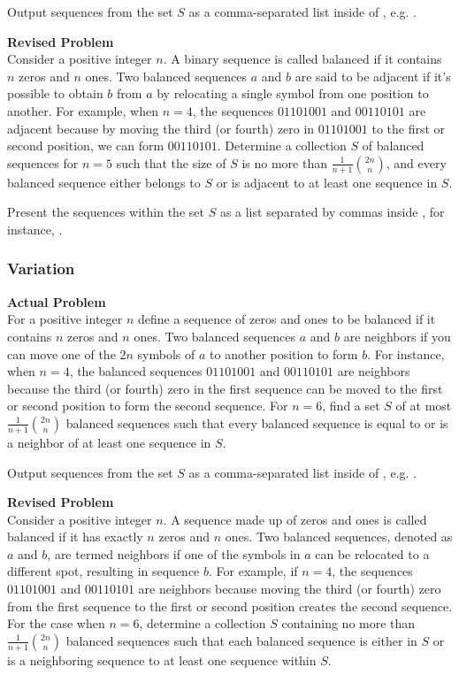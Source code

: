 Output sequences from the set $S$ as a comma-separated list inside of \boxed{}, e.g. .

\textbf{Revised Problem}\\
Consider a positive integer $n$. A binary sequence is called balanced if it contains $n$ zeros and $n$ ones. Two balanced sequences $a$ and $b$ are said to be adjacent if it's possible to obtain $b$ from $a$ by relocating a single symbol from one position to another. For example, when $n = 4$, the sequences $01101001$ and $00110101$ are adjacent because by moving the third (or fourth) zero in $01101001$ to the first or second position, we can form $00110101$. Determine a collection $S$ of balanced sequences for $n = 5$ such that the size of $S$ is no more than $\frac{1}{n + 1} \binom{2n}{n}$, and every balanced sequence either belongs to $S$ or is adjacent to at least one sequence in $S$.

Present the sequences within the set $S$ as a list separated by commas inside \boxed{}, for instance, .

\subsubsection{Variation}
\textbf{Actual Problem}\\
For a positive integer $n$ define a sequence of zeros and ones to be balanced if it contains $n$ zeros and $n$ ones. 
Two balanced sequences $a$ and $b$ are neighbors if you can move one of the $2n$ symbols of $a$ to another position to form $b$. For instance, when $n = 4$, the balanced sequences $01101001$ and $00110101$ are neighbors because the third (or fourth) zero in the first sequence can be moved to the first or second position to form the second sequence. 
For $n = 6$, find a set $S$ of at most $\frac {1}{n + 1} \binom{2n}{n}$ balanced sequences such that every balanced sequence is equal to or is a neighbor of at least one sequence in $S$.


Output sequences from the set $S$ as a comma-separated list inside of \boxed{}, e.g. .

\textbf{Revised Problem}\\
Consider a positive integer \( n \). A sequence made up of zeros and ones is called balanced if it has exactly \( n \) zeros and \( n \) ones. Two balanced sequences, denoted as \( a \) and \( b \), are termed neighbors if one of the symbols in \( a \) can be relocated to a different spot, resulting in sequence \( b \). For example, if \( n = 4 \), the sequences \( 01101001 \) and \( 00110101 \) are neighbors because moving the third (or fourth) zero from the first sequence to the first or second position creates the second sequence. For the case when \( n = 6 \), determine a collection \( S \) containing no more than \( \frac{1}{n + 1} \binom{2n}{n} \) balanced sequences such that each balanced sequence is either in \( S \) or is a neighboring sequence to at least one sequence within \( S \).

